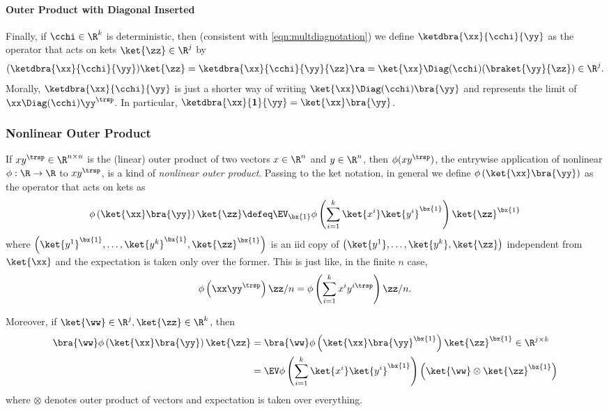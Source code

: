 \paragraph{Outer Product with Diagonal Inserted}
Finally, if $\cchi\in\R^{k}$ is deterministic, then (consistent with \cref{eqn:multdiagnotation}) we define $\ketdbra{\xx}{\cchi}{\yy}$
as the operator that acts on kets $\ket{\zz}\in\R^{j}$ by
\[
(\ketdbra{\xx}{\cchi}{\yy})\ket{\zz}=\ketdbra{\xx}{\cchi}{\yy}{\zz}\ra=\ket{\xx}\Diag(\cchi)(\braket{\yy}{\zz})\in\R^{j}.
\]
Morally, $\ketdbra{\xx}{\cchi}{\yy}$ is just a shorter way of writing
$\ket{\xx}\Diag(\cchi)\bra{\yy}$ and represents the limit of $\xx\Diag(\cchi)\yy^{\trsp}$.
In particular, $\ketdbra{\xx}{\boldsymbol{1}}{\yy}=\ket{\xx}\bra{\yy}$.

\subsubsection{Nonlinear Outer Product}

If $x y^\trsp \in \R^{n\times n}$ is the (linear) outer product of two vectors $x \in \R^n$ and $y \in \R^n$, then $\phi(xy^\trsp)$, the entrywise application of nonlinear $\phi: \R \to \R$ to $xy^\trsp$, is a kind of \emph{nonlinear outer product}.%
Passing to the ket notation, in general we define $\phi\left(\ket{\xx}\bra{\yy}\right)$
as the operator that acts on kets as
\[
\phi\left(\ket{\xx}\bra{\yy}\right)\ket{\zz}\defeq\EV_{\bx{1}}\phi\left(\sum_{i=1}^{k}\ket{x^{i}}\ket{y^{i}}^{\bx{1}}\right)\ket{\zz}^{\bx{1}}
\]
where $\left(\ket{y^{1}}^{\bx{1}},\ldots,\ket{y^{k}}^{\bx{1}},\ket{\zz}^{\bx{1}}\right)$
is an iid copy of $\left(\ket{y^{1}},\ldots,\ket{y^{k}},\ket{\zz}\right)$
independent from $\ket{\xx}$ and the expectation is taken only over
the former. 
This is just like, in the finite $n$ case,
\[
\phi\left(\xx \yy^\trsp \right)\zz/n = \phi\left(\sum_{i=1}^{k} x^{i}{y^{i\trsp}}\right) {\zz}/n.
\]

Moreover, if $\ket{\ww}\in\R^{j},\ket{\zz}\in\R^{k}$,
then
\begin{align*}
\bra{\ww}\phi\left(\ket{\xx}\bra{\yy}\right)\ket{\zz} & =\bra{\ww}\phi\left(\ket{\xx}\bra{\yy}^{\bx{1}}\right)\ket{\zz}^{\bx{1}}\in\R^{j\times k}\\
 & =\EV\phi\left(\sum_{i=1}^{k}\ket{x^{i}}\ket{y^{i}}^{\bx{1}}\right)\left(\ket{\ww}\otimes\ket{\zz}^{\bx{1}}\right)
\end{align*}
where $\otimes$ denotes outer product of vectors and expectation
is taken over everything.

